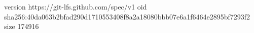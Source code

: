 version https://git-lfs.github.com/spec/v1
oid sha256:40da063b2bfad290d1710553408f8a2a18080bbb07e6a1f6464e2895bf7293f2
size 174916
